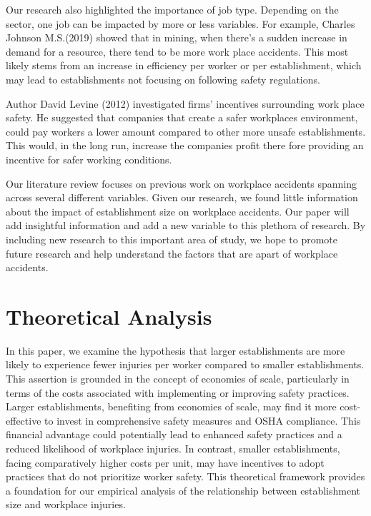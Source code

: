 \documentclass[12pt]{article}
\begin{document}
Our research also highlighted the importance of job type. Depending on the sector, one job can be impacted by more or less variables. For example, Charles Johnson M.S.(2019) showed that in mining, when there's a sudden increase in demand for a resource, there tend to be more work place accidents. This most likely stems from an increase in efficiency per worker or per establishment, which may lead to establishments not focusing on following safety regulations.  

Author David Levine (2012) investigated firms' incentives surrounding work place safety. He suggested that companies that create a safer workplaces environment, could pay workers a lower amount compared to other more unsafe establishments. This would, in the long run, increase the companies profit there fore providing an incentive for safer working conditions. 

Our literature review focuses on previous work on workplace accidents spanning across several different variables. Given our research, we found little information about the impact of establishment size on workplace accidents. Our paper will add insightful information and add a new variable to this plethora of research. By including new research to this important area of study, we hope to promote future research and help understand the factors that are apart of workplace accidents. 

\section{Theoretical Analysis}
\label{sec:theory}

In this paper, we examine the hypothesis that larger establishments are more likely to experience fewer injuries per worker compared to smaller establishments. This assertion is grounded in the concept of economies of scale, particularly in terms of the costs associated with implementing or improving safety practices. Larger establishments, benefiting from economies of scale, may find it more cost-effective to invest in comprehensive safety measures and OSHA compliance. This financial advantage could potentially lead to enhanced safety practices and a reduced likelihood of workplace injuries. In contrast, smaller establishments, facing comparatively higher costs per unit, may have incentives to adopt practices that do not prioritize worker safety. This theoretical framework provides a foundation for our empirical analysis of the relationship between establishment size and workplace injuries.
\end{document}
